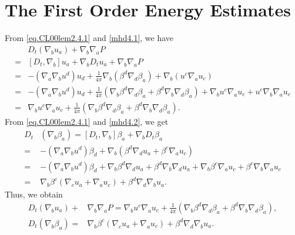 \documentclass[12pt,reqno]{amsart}
\numberwithin{equation}{section}
\theoremstyle{definition}
\theoremstyle{remark}
\begin{document}
\section{The First Order Energy Estimates}

From \eqref{eq.CL00lem2.4.1} and \eqref{mhd4.1}, we have
\begin{align*}
  &D_t({\nabla}_b u_a)+{\nabla}_b{\nabla}_a{P } \\
  =&[D_t,{\nabla}_b]u_a+{\nabla}_b D_t u_a+{\nabla}_b{\nabla}_a{P } \\
  =&-({\nabla}_a{\nabla}_b u^d) u_d+\frac{1}{4\pi}{\nabla}_b(\beta^d{\nabla}_d\beta_a)+{\nabla}_b(u^c{\nabla}_a u_c)\\
  =&-({\nabla}_a{\nabla}_b u^d) u_d+\frac{1}{4\pi}({\nabla}_b\beta^d {\nabla}_d\beta_a+\beta^d{\nabla}_b{\nabla}_d\beta_a)+{\nabla}_b u^c{\nabla}_au_c+u^c{\nabla}_b{\nabla}_au_c\\
  =&{\nabla}_b u^c{\nabla}_au_c+\frac{1}{4\pi}({\nabla}_b\beta^d {\nabla}_d\beta_a+\beta^d{\nabla}_b{\nabla}_d\beta_a).
\end{align*}
From \eqref{eq.CL00lem2.4.1} and \eqref{mhd4.2}, we get
\begin{align*}
D_t&({\nabla}_b\beta_a)=[D_t,{\nabla}_b]\beta_a+{\nabla}_b D_t \beta_a\\
  =&-({\nabla}_a{\nabla}_b u^d) \beta_d+{\nabla}_b(\beta^d{\nabla}_d u_a+\beta^c{\nabla}_a u_c)\\
  =&-({\nabla}_a{\nabla}_b u^d) \beta_d+{\nabla}_b\beta^d{\nabla}_d u_a+\beta^d{\nabla}_b{\nabla}_d u_a+{\nabla}_b\beta^c{\nabla}_a u_c+\beta^c{\nabla}_b{\nabla}_a u_c\\
  =&{\nabla}_b\beta^c({\nabla}_c u_a+{\nabla}_a u_c)+\beta^d{\nabla}_d{\nabla}_b u_a.
\end{align*}
Thus, we obtain
\begin{align}\label{eq.1energy1}
D_t({\nabla}_b u_a)+&{\nabla}_b{\nabla}_a{P }
={\nabla}_b u^c{\nabla}_au_c+\frac{1}{4\pi}({\nabla}_b\beta^d {\nabla}_d\beta_a+\beta^d{\nabla}_b{\nabla}_d\beta_a),\\ \label{eq.1energy2}
D_t({\nabla}_b\beta_a)=&{\nabla}_b\beta^c({\nabla}_c u_a+{\nabla}_a u_c)+\beta^d{\nabla}_d{\nabla}_b u_a.
\end{align}
\end{document}

